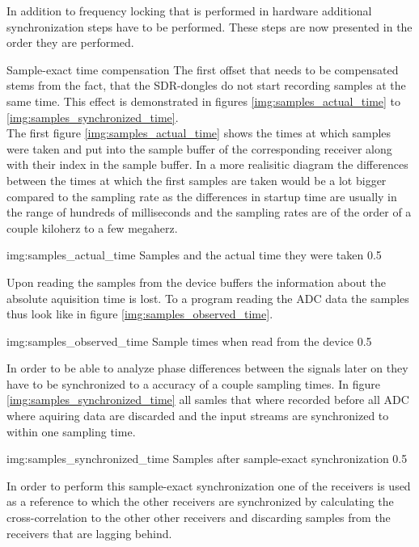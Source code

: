 In addition to frequency locking that is performed in
hardware additional synchronization steps have to
be performed. These steps are now presented in the
order they are performed. \\


\begin{subchapter}{Sample-exact time compensation}
  The first offset that needs to be compensated stems
  from the fact, that the SDR-dongles do not start
  recording samples at the same time.
  This effect is demonstrated in figures
  \ref{img:samples_actual_time} to \ref{img:samples_synchronized_time}. \\

  The first figure \ref{img:samples_actual_time} shows the
  times at which samples were taken and put into the
  sample buffer of the corresponding receiver along
  with their index in the sample buffer.
  In a more realisitic diagram the differences between the
  times at which the first samples are taken would be
  a lot bigger compared to the sampling rate as the
  differences in startup time are usually in the range
  of hundreds of milliseconds and the sampling rates are
  of the order of a couple kiloherz to a few megaherz.

               {img:samples_actual_time}
               {Samples and the actual time they were taken}
               {0.5}

  Upon reading the samples from the device buffers
  the information about the absolute aquisition time is
  lost. To a program reading the ADC data the
  samples thus look like in figure \ref{img:samples_observed_time}.

               {img:samples_observed_time}
               {Sample times when read from the device}
               {0.5}

  In order to be able to analyze phase differences between
  the signals later on they have to be synchronized to
  a accuracy of a couple sampling times.
  In figure \ref{img:samples_synchronized_time} all
  samles that where recorded before all ADC where aquiring
  data are discarded and the input streams are
  synchronized to within one sampling time.

               {img:samples_synchronized_time}
               {Samples after sample-exact synchronization}
               {0.5}

  In order to perform this sample-exact synchronization
  one of the receivers is used as a reference to which
  the other receivers are synchronized by calculating the
  cross-correlation to the other other receivers and discarding
  samples from the receivers that are lagging behind. \\


\end{subchapter}
